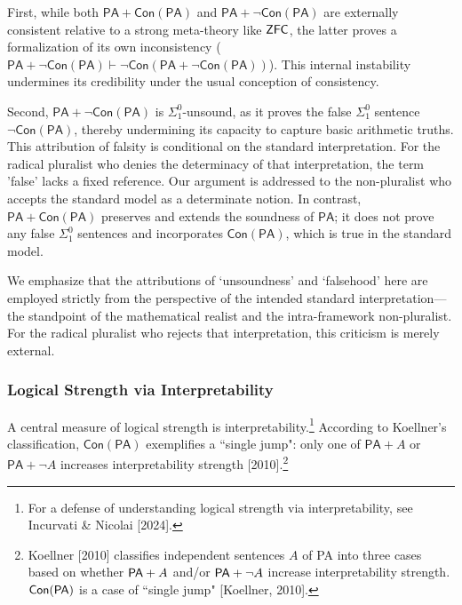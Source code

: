 \documentclass[a4paper,12pt]{amsart}
\theoremstyle{definition}
\numberwithin{equation}{section}
\begin{document}
First, while both $\mathsf{PA} + \mathsf{Con(PA)}$ and $\mathsf{PA} + \neg \mathsf{Con(PA)}$ are externally consistent relative to a strong meta-theory like $\sf ZFC$, the latter proves a formalization of its own inconsistency ($\mathsf{PA}+\neg \mathsf{Con(PA)} \vdash \neg \mathsf{Con}(\mathsf{PA}+\neg \mathsf{Con(PA)})$). This internal instability undermines its credibility under the usual conception of consistency.

Second, $\mathsf{PA} + \neg \mathsf{Con(PA)}$ is $\Sigma^0_1$-unsound, as it proves the false $\Sigma^0_1$ sentence $\neg \mathsf{Con(PA)}$, thereby undermining its capacity to capture basic arithmetic truths. This attribution of falsity is conditional on the standard interpretation. For the radical pluralist who denies the determinacy of that interpretation, the term 'false' lacks a fixed reference. Our argument is addressed to the non-pluralist who accepts the standard model as a determinate notion. In contrast, $\mathsf{PA} + \mathsf{Con(PA)}$ preserves and extends the soundness of $\mathsf{PA}$; it does not prove any false $\Sigma^0_1$ sentences and incorporates $\mathsf{Con(PA)}$, which is true in the standard model.

We emphasize that the attributions of `unsoundness' and `falsehood' here are employed strictly from the perspective of the intended standard interpretation—the standpoint of the mathematical realist and the intra-framework non-pluralist. For the radical pluralist who rejects that interpretation, this criticism is merely external.

\subsubsection{Logical Strength via Interpretability}


A central measure of logical strength is interpretability.\footnote{For a defense of understanding logical strength via interpretability, see Incurvati \& Nicolai [2024].} According to Koellner's classification, $\mathsf{Con(PA)}$ exemplifies a ``single jump": only one of $\mathsf{PA}+A$ or $\mathsf{PA}+\neg A$ increases interpretability strength [2010].\footnote{Koellner [2010] classifies independent sentences $A$ of {\sf PA} into three cases based on whether ${\sf PA}+ A$ and/or ${\sf PA}+ \neg A$ increase interpretability strength. ${\sf Con(PA)}$ is a case of ``single jump" [Koellner, 2010].}
\end{document}
